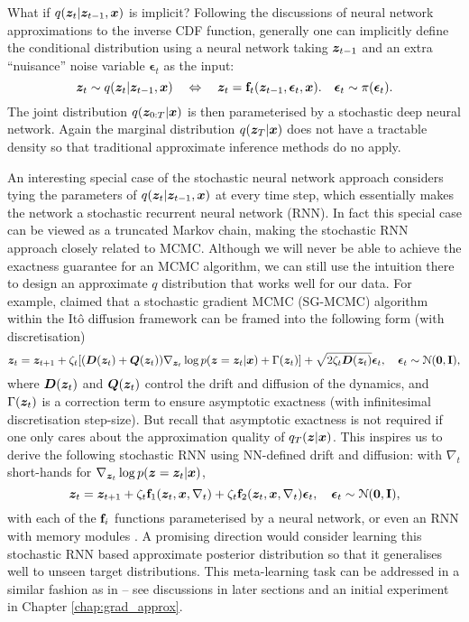 What if $q(\bm{z}_t | \bm{z}_{t-1}, \bm{x})$ is implicit? Following the discussions of neural network approximations to the inverse CDF function, generally one can implicitly define the conditional distribution using a neural network taking $\bm{z}_{t-1}$ and an extra ``nuisance'' noise variable $\bm{\epsilon}_t$ as the input:
\begin{equation}
\bm{z}_{t} \sim q(\bm{z}_t | \bm{z}_{t-1}, \bm{x}) \quad \Leftrightarrow \quad \bm{z}_t = \mathbf{f}_{t}(\bm{z}_{t-1}, \bm{\epsilon}_t, \bm{x}). \quad \bm{\epsilon}_t \sim \pi(\bm{\epsilon}_t).
\end{equation}
The joint distribution $q(\bm{z}_{0:T} | \bm{x})$ is then parameterised by a stochastic deep neural network. Again the marginal distribution $q(\bm{z}_T | \bm{x})$ does not have a tractable density so that traditional approximate inference methods do no apply.

An interesting special case of the stochastic neural network approach considers tying the parameters of $q(\bm{z}_t|\bm{z}_{t-1}, \bm{x})$ at every time step, which essentially makes the network a stochastic recurrent neural network (RNN). In fact this special case can be viewed as a truncated Markov chain, making the stochastic RNN approach closely related to MCMC. Although we will never be able to achieve the exactness guarantee for an MCMC algorithm, we can still use the intuition there to design an approximate $q$ distribution that works well for our data. For example, \cite{ma:mcmc_recipe2015} claimed that a stochastic gradient MCMC (SG-MCMC) algorithm within the It\^{o} diffusion framework can be framed into the following form (with discretisation)
\begin{equation}
\bm{z}_{t} = \bm{z}_{t+1} + \zeta_t [ (\bm{D}(\bm{z}_t) + \bm{Q}(\bm{z}_t) ) \nabla_{\bm{z}_t} \log p(\bm{z} = \bm{z}_t | \bm{x}) + \Gamma(\bm{z}_t) ] + \sqrt{2 \zeta_t \bm{D}(\bm{z}_t)} \bm{\epsilon}_t, \quad \bm{\epsilon}_t \sim \mathcal{N}(\bm{0}, \mathbf{I}),
\label{eq:chap5_mcmc_recipe}
\end{equation}
where $\bm{D}(\bm{z}_t)$ and $\bm{Q}(\bm{z}_t)$ control the drift and diffusion of the dynamics, and $\Gamma(\bm{z}_t)$ is a correction term to ensure asymptotic exactness (with infinitesimal discretisation step-size).
%
But recall that asymptotic exactness is not required if one only cares about the approximation quality of $q_T(\bm{z}|\bm{x})$.
%
This inspires us to derive the following stochastic RNN using NN-defined drift and diffusion: with $\nabla_t$ short-hands for $ \nabla_{\bm{z}_t} \log p(\bm{z} = \bm{z}_t | \bm{x})$,
\begin{equation}
\bm{z}_{t} = \bm{z}_{t+1} + \zeta_t \mathbf{f}_1 (\bm{z}_t, \bm{x}, \nabla_t) +  \zeta_t \mathbf{f}_2 (\bm{z}_t, \bm{x}, \nabla_t) \bm{\epsilon}_t, \quad \bm{\epsilon}_t \sim \mathcal{N}(\bm{0}, \mathbf{I}),
\end{equation}
with each of the $\mathbf{f}_i$ functions parameterised by a neural network, or even an RNN with memory modules \citep{hochreiter:lstm1997, graves:ntm2014}. A promising direction would consider learning this stochastic RNN based approximate posterior distribution so that it generalises well to unseen target distributions. This meta-learning task can be addressed in a similar fashion as in \citet{andrychowicz:gradient2016, li:optimize2016} -- see discussions in later sections and an initial experiment in Chapter \ref{chap:grad_approx}. 

